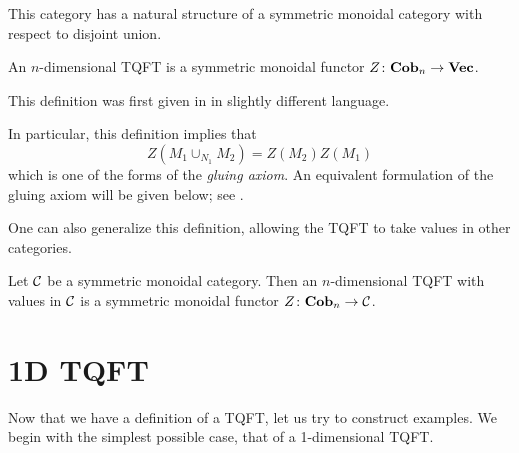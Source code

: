 This category has a natural structure of a symmetric monoidal
category with respect to disjoint union.

\begin{definition}\label{d:tqft}
  An $n$-dimensional TQFT is a symmetric
  monoidal functor $Z\colon \mathbf{Cob}_n\to \mathbf{Vec}$.
\end{definition}
This definition was first given in \cite{atiyah} in slightly different
language.

In particular, this definition implies that
\begin{equation}\label{e:tqft-gluing0}
  Z( M_1\cup_{N_1} M_2) = Z(M_2) Z(M_1)
\end{equation}
which is one of the forms of the \emph{gluing axiom}.
An equivalent formulation of the gluing axiom will be given below; see
.


One can also generalize this definition, allowing the TQFT to take values in
other categories.

\begin{definition}\label{d:tqft-c}
  Let $\mathcal{C}$ be a symmetric monoidal category. Then an
  $n$-dimensional TQFT with values in $\mathcal{C}$ is a symmetric
    monoidal functor $Z\colon \mathbf{Cob}_n\to \mathcal{C}$.
\end{definition}
\section{1D TQFT}\label{s:1d-tqft}

Now that we have a definition of a TQFT, let us try to construct examples. We
begin with the simplest possible case, that of a 1-dimensional TQFT.

